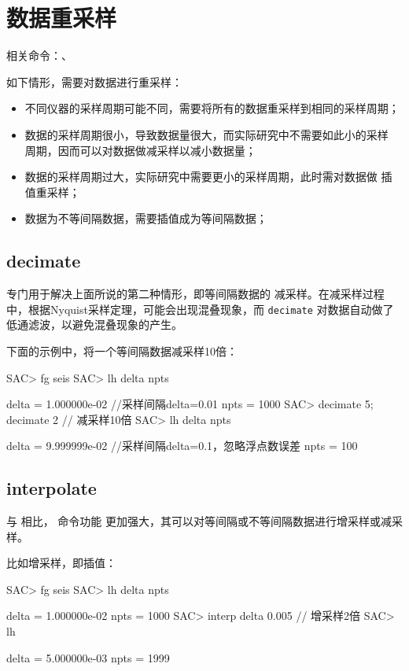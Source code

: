 \section{数据重采样}
相关命令：、

如下情形，需要对数据进行重采样：
\begin{itemize}
\item 不同仪器的采样周期可能不同，需要将所有的数据重采样到相同的采样周期；
\item 数据的采样周期很小，导致数据量很大，而实际研究中不需要如此小的采样
    周期，因而可以对数据做减采样以减小数据量；
\item 数据的采样周期过大，实际研究中需要更小的采样周期，此时需对数据做
    插值重采样；
\item 数据为不等间隔数据，需要插值成为等间隔数据；
\end{itemize}

\subsection{decimate}
 专门用于解决上面所说的第二种情形，即等间隔数据的
减采样。在减采样过程中，根据Nyquist采样定理，可能会出现混叠现象，而 
\texttt{decimate} 对数据自动做了低通滤波，以避免混叠现象的产生。

下面的示例中，将一个等间隔数据减采样10倍：
\begin{SACCode}
SAC> fg seis
SAC> lh delta npts

     delta = 1.000000e-02       //采样间隔delta=0.01
      npts = 1000
SAC> decimate 5; decimate 2     // 减采样10倍
SAC> lh delta npts

     delta = 9.999999e-02       //采样间隔delta=0.1，忽略浮点数误差
      npts = 100
\end{SACCode}

\subsection{interpolate}
与  相比， 命令功能
更加强大，其可以对等间隔或不等间隔数据进行增采样或减采样。

比如增采样，即插值：
\begin{SACCode}
SAC> fg seis
SAC> lh delta npts

     delta = 1.000000e-02
     npts = 1000
SAC> interp delta 0.005         // 增采样2倍
SAC> lh

     delta = 5.000000e-03
     npts = 1999
\end{SACCode}

